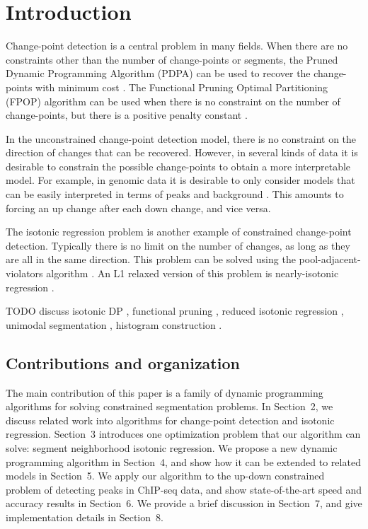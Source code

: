 \documentclass{article}
\begin{document}
\section{Introduction}

Change-point detection is a central problem in many fields. When there
are no constraints other than the number of change-points or segments,
the Pruned Dynamic Programming Algorithm (PDPA) can be used to recover
the change-points with minimum cost \citep{pruned-dp}. The Functional
Pruning Optimal Partitioning (FPOP) algorithm can be used when there
is no constraint on the number of change-points, but there is a
positive penalty constant \citep{FPOP}. 

In the unconstrained change-point detection model, there is no
constraint on the direction of changes that can be recovered. However,
in several kinds of data it is desirable to constrain the possible
change-points to obtain a more interpretable model. For example, in
genomic data it is desirable to only consider models that can be
easily interpreted in terms of peaks and background
\citep{HOCKING-PeakSeg}. This amounts to forcing an up change after each down
change, and vice versa.

The isotonic regression problem is another example of constrained
change-point detection. Typically there is no limit on the number of
changes, as long as they are all in the same direction. This problem
can be solved using the pool-adjacent-violators algorithm
\citep{mair2009isotone}. An L1 relaxed version of this problem is
nearly-isotonic regression \citep{tibshirani2011nearly}.

TODO discuss isotonic DP \citep{isotonic-dp}, functional pruning
\citep{phd-johnson}, reduced isotonic regression
\citep{hardwick2014optimal, reduced-monotonic-regression}, unimodal
segmentation \citep{haiminen2008algorithms}, histogram construction
\citep{halim2009fast}.

\subsection{Contributions and organization}

The main contribution of this paper is a family of dynamic programming
algorithms for solving constrained segmentation problems. In
Section~2, we discuss related work into algorithms for change-point
detection and isotonic regression. Section~3 introduces one
optimization problem that our algorithm can solve: segment
neighborhood isotonic regression. We propose a new dynamic programming
algorithm in Section~4, and show how it can be extended to related
models in Section~5. We apply our algorithm to the up-down constrained
problem of detecting peaks in ChIP-seq data, and show state-of-the-art
speed and accuracy results in Section~6. We provide a brief discussion in
Section~7, and give implementation details in Section~8.
\end{document}
